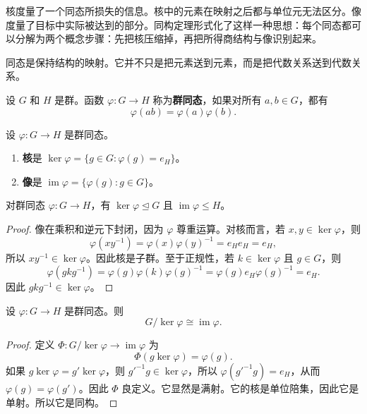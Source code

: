 核度量了一个同态所损失的信息。核中的元素在映射之后都与单位元无法区分。像度量了目标中实际被达到的部分。同构定理形式化了这样一种思想：每个同态都可以分解为两个概念步骤：先把核压缩掉，再把所得商结构与像识别起来。

同态是保持结构的映射。它并不只是把元素送到元素，而是把代数关系送到代数关系。

\begin{definition}[群同态]
设 $G$ 和 $H$ 是群。函数 $\varphi:G\to H$ 称为\textbf{群同态}，如果对所有 $a,b\in G$，都有
\[
    \varphi(ab)=\varphi(a)\varphi(b).
\]
\end{definition}

\begin{definition}[核与像]
设 $\varphi:G\to H$ 是群同态。
\begin{enumerate}
    \item \textbf{核}是 $\ker\varphi=\{g\in G:\varphi(g)=e_H\}$。
    \item \textbf{像}是 $\operatorname{im}\varphi=\{\varphi(g):g\in G\}$。
\end{enumerate}
\end{definition}

\begin{proposition}
对群同态 $\varphi:G\to H$，有 $\ker\varphi\trianglelefteq G$ 且 $\operatorname{im}\varphi\leq H$。
\end{proposition}

\begin{proof}
像在乘积和逆元下封闭，因为 $\varphi$ 尊重运算。对核而言，若 $x,y\in\ker\varphi$，则
\[
    \varphi(xy^{-1})=\varphi(x)\varphi(y)^{-1}=e_He_H=e_H,
\]
所以 $xy^{-1}\in\ker\varphi$。因此核是子群。至于正规性，若 $k\in\ker\varphi$ 且 $g\in G$，则
\[
    \varphi(gkg^{-1})=\varphi(g)\varphi(k)\varphi(g)^{-1}=\varphi(g)e_H\varphi(g)^{-1}=e_H.
\]
因此 $gkg^{-1}\in\ker\varphi$。
\end{proof}

\begin{theorem}[群第一同构定理]
设 $\varphi:G\to H$ 是群同态。则
\[
    G/\ker\varphi\cong \operatorname{im}\varphi.
\]
\end{theorem}

\begin{proof}
定义 $\Phi:G/\ker\varphi\to\operatorname{im}\varphi$ 为
\[
    \Phi(g\ker\varphi)=\varphi(g).
\]
如果 $g\ker\varphi=g'\ker\varphi$，则 $g'^{-1}g\in\ker\varphi$，所以 $\varphi(g'^{-1}g)=e_H$，从而 $\varphi(g)=\varphi(g')$。因此 $\Phi$ 良定义。它显然是满射。它的核是单位陪集，因此它是单射。所以它是同构。
\end{proof}


